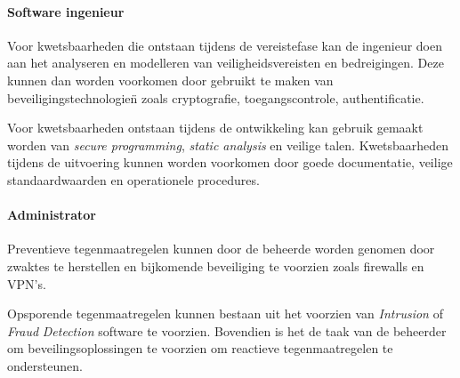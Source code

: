\documentclass[../main.tex]{subfiles}
\begin{document}
\paragraph{Software ingenieur} 
Voor kwetsbaarheden die ontstaan tijdens de vereistefase kan de ingenieur doen aan het analyseren en modelleren van veiligheidsvereisten  en bedreigingen. Deze kunnen dan worden voorkomen door gebruikt te maken van beveiligingstechnologie\"n zoals cryptografie, toegangscontrole, authentificatie.

Voor kwetsbaarheden ontstaan tijdens de ontwikkeling kan gebruik gemaakt worden van \textit{secure programming}, \textit{static analysis} en veilige talen. Kwetsbaarheden tijdens de uitvoering kunnen worden voorkomen door goede documentatie, veilige standaardwaarden en operationele procedures.

\paragraph{Administrator} 
Preventieve tegenmaatregelen kunnen door de beheerde worden genomen door zwaktes te herstellen en bijkomende beveiliging te voorzien zoals firewalls en VPN's. 

Opsporende tegenmaatregelen kunnen bestaan uit het voorzien van \textit{Intrusion} of \textit{Fraud} \textit{Detection} software te voorzien. Bovendien is het de taak van de beheerder om beveilingsoplossingen te voorzien om reactieve tegenmaatregelen te ondersteunen.
\end{document}
